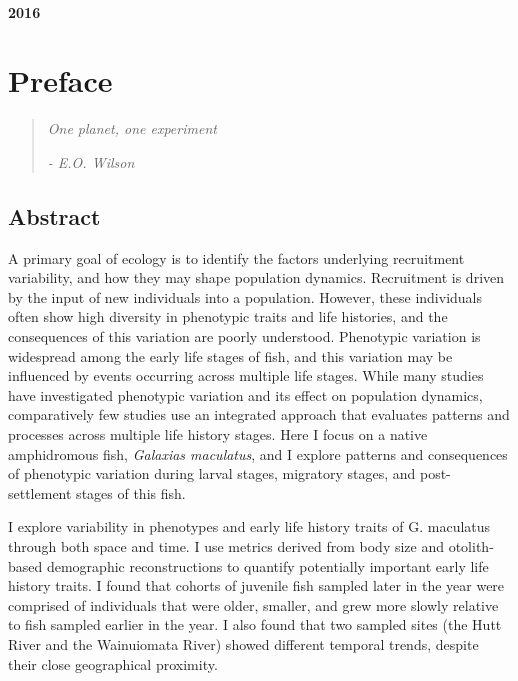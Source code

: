 \documentclass[]{book}
\begin{document}
\subsubsection*{2016}\label{section}

\chapter*{Preface}\label{preface}

\begin{quote}
\emph{One planet, one experiment}

\emph{- E.O. Wilson}
\end{quote}

\section*{Abstract}\label{abstract}

A primary goal of ecology is to identify the factors underlying
recruitment variability, and how they may shape population dynamics.
Recruitment is driven by the input of new individuals into a population.
However, these individuals often show high diversity in phenotypic
traits and life histories, and the consequences of this variation are
poorly understood. Phenotypic variation is widespread among the early
life stages of fish, and this variation may be influenced by events
occurring across multiple life stages. While many studies have
investigated phenotypic variation and its effect on population dynamics,
comparatively few studies use an integrated approach that evaluates
patterns and processes across multiple life history stages. Here I focus
on a native amphidromous fish, \emph{Galaxias maculatus}, and I explore
patterns and consequences of phenotypic variation during larval stages,
migratory stages, and post-settlement stages of this fish.

I explore variability in phenotypes and early life history traits of G.
maculatus through both space and time. I use metrics derived from body
size and otolith-based demographic reconstructions to quantify
potentially important early life history traits. I found that cohorts of
juvenile fish sampled later in the year were comprised of individuals
that were older, smaller, and grew more slowly relative to fish sampled
earlier in the year. I also found that two sampled sites (the Hutt River
and the Wainuiomata River) showed different temporal trends, despite
their close geographical proximity.
\end{document}

